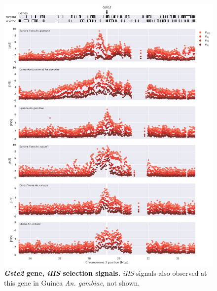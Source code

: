 \documentclass[a4paper,11pt,abstracton,hidelinks]{scrartcl}
\begin{document}
\begin{figure}[t!]
	\begin{center}
		\includegraphics*[width=1.1\linewidth,center]{artwork/locus_gste2_ihs.png}
	\end{center}
	\caption[\textit{Gste2} gene, \textit{iHS} selection signals]{
	\textbf{\textit{Gste2} gene, \textit{iHS} selection signals.}
	\textit{iHS} signals also observed at this gene in Guinea \textit{An. gambiae}, not shown. 
	} 
	\label{fig:locus_gste2_ihs}
\end{figure}


\clearpage
\end{document}
